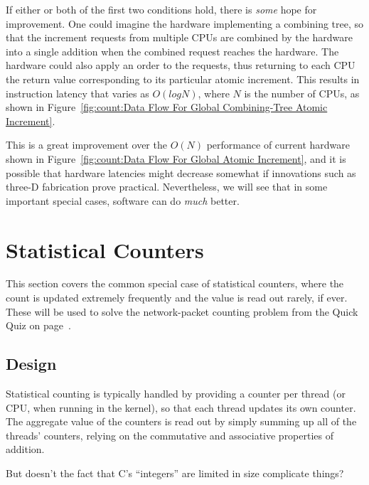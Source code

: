 {	If either or both of the first two conditions hold, there is
	\emph{some} hope for improvement.
	One could imagine the hardware implementing a combining tree,
	so that the increment requests from multiple CPUs are combined
	by the hardware into a single addition when the combined request
	reaches the hardware.
	The hardware could also apply an order to the requests, thus
	returning to each CPU the return value corresponding to its
	particular atomic increment.
	This results in instruction latency that varies as $O(log N)$,
	where $N$ is the number of CPUs, as shown in
	Figure~\ref{fig:count:Data Flow For Global Combining-Tree Atomic Increment}.

	This is a great improvement over the $O(N)$ performance
	of current hardware shown in
	Figure~\ref{fig:count:Data Flow For Global Atomic Increment},
	and it is possible that hardware latencies might decrease
	somewhat if innovations such as three-D fabrication prove
	practical.
	Nevertheless, we will see that in some important special cases,
	software can do \emph{much} better.
} \QuickQuizEnd

\section{Statistical Counters}
\label{sec:count:Statistical Counters}

This section covers the common special case of statistical counters, where
the count is updated extremely frequently and the value is read out
rarely, if ever.
These will be used to solve the network-packet counting problem
from the Quick Quiz on
page~\pageref{chp:Counting}.

\subsection{Design}

Statistical counting is typically handled by providing a counter per
thread (or CPU, when running in the kernel), so that each thread
updates its own counter.
The aggregate value of the counters is read out by simply summing up
all of the threads' counters,
relying on the commutative and associative properties of addition.

\QuickQuiz{}
	But doesn't the fact that C's ``integers'' are limited in size
	complicate things?
 \QuickQuizEnd

